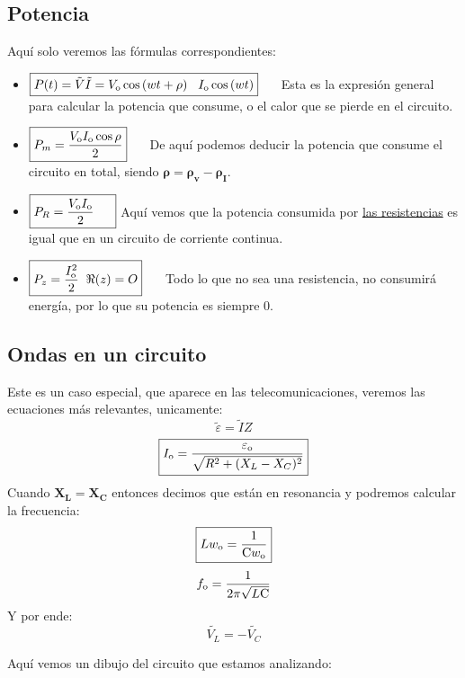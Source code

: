 \subsection{Potencia}
\noindent Aquí solo veremos las fórmulas correspondientes:
\begin{itemize}
        \item \(
              \boxed{P(t) = \tilde{V}\tilde{I} = V_{\textnormal{o}}\cos{(wt + \rho)}\hspace{3mm}I_{\textnormal{o}}\cos{(wt)}} \hspace{5mm} \) Esta es la expresión general para calcular la potencia que consume, o el calor que se pierde en el circuito.
        \item \(
              \boxed{P_m = \frac{V_{\textnormal{o}}I_{\textnormal{o}}\cos{\rho}}{2}}\hspace{5mm}
              \) De aquí podemos deducir la potencia que consume el circuito en total, siendo \(\mathbf{\rho = \rho_v - \rho_I}\).
        \item \(
              \boxed{P_R= \frac{V_{\textnormal{o}}I_{\textnormal{o}}}{2}\hspace{5mm}}\) Aquí vemos que la potencia consumida por \underline{las resistencias} es igual que en un circuito de corriente continua.
              \item\(\boxed{P_z = \frac{I_{\textnormal{o}}^2}{2}\hspace{2mm} \Re(z) = O} \hspace{5mm}
              \) Todo lo que no sea una resistencia, no consumirá energía, por lo que su potencia es siempre 0.
\end{itemize}
\subsection{Ondas en un circuito}
\noindent Este es un caso especial, que aparece en las telecomunicaciones, veremos las ecuaciones más relevantes, unicamente:
\[
        \tilde{\varepsilon} = \tilde{I}Z
\]
\[
        \boxed{I_{\textnormal{o}} = \frac{\varepsilon_{\textnormal{o}}}{\sqrt{R^2+(X_L - X_C)^2}}}
\]
\noindent Cuando \(\mathbf{X_L = X_C}\) entonces decimos que están en resonancia y podremos calcular la frecuencia:
\[
        \boxed{Lw_{\textnormal{o}} = \frac{1}{\mathrm{C}w_{\textnormal{o}}}}
\]
\[
        f_{\textnormal{o}} = \frac{1}{2\pi\sqrt{L\mathrm{C}}}
\]
\noindent Y por ende:
\[
        \boxed{\tilde{V_L} = -\tilde{V_C}}
\]
\begin{wrapfigure}{l}{2cm}
\end{wrapfigure}
\noindent Aquí vemos un dibujo del circuito que estamos analizando:
